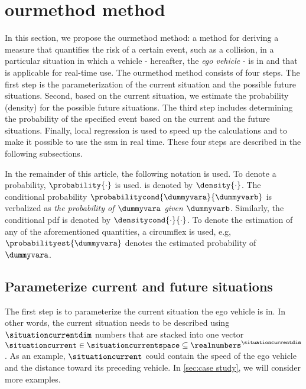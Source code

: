 \section{\acl{ourmethod} method}
\label{sec:method}

In this section, we propose the \cstarta\ac{ourmethod} method: \cenda a method for deriving a measure that quantifies the risk of a certain event, such as a collision, in a particular situation in which a vehicle - hereafter, the \textit{ego vehicle} - is in and that is applicable for real-time use.
\cstarta The \ac{ourmethod} method \cenda consists of four steps. 
The first step is the parameterization of the current situation and the possible future situations.
Second, based on the current situation, we estimate the probability (density) for the possible future situations. 
The third step includes determining the probability of the specified event based on the current and the future situations.
Finally, local regression is used to speed up the calculations and to make it possible to use the \ac{ssm} in real time. 
These four steps are described in the following subsections.

In the remainder of this article, the following notation is used. 
To denote a probability, $\probability{\cdot}$ is used. 
 is denoted by $\density{\cdot}$. 
The conditional probability $\probabilitycond{\dummyvara}{\dummyvarb}$ is verbalized as \textit{the probability of $\dummyvara$ given $\dummyvarb$}. 
Similarly, the conditional \ac{pdf} is denoted by $\densitycond{\cdot}{\cdot}$. 
To denote the estimation of any of the aforementioned quantities, a circumflex is used, e.g, $\probabilityest{\dummyvara}$ denotes the estimated probability of $\dummyvara$.



\subsection{Parameterize current and future situations}
\label{sec:parametrization}

The first step is to parameterize the current situation the ego vehicle is in. 
In other words, the current situation needs to be described using $\situationcurrentdim$ numbers that are stacked into one vector $\situationcurrent \in \situationcurrentspace \subseteq \realnumbers^{\situationcurrentdim}$. 
As an example, $\situationcurrent$ could contain the speed of the ego vehicle and the distance toward its preceding vehicle. 
In \cref{sec:case study}, we will consider more examples.

